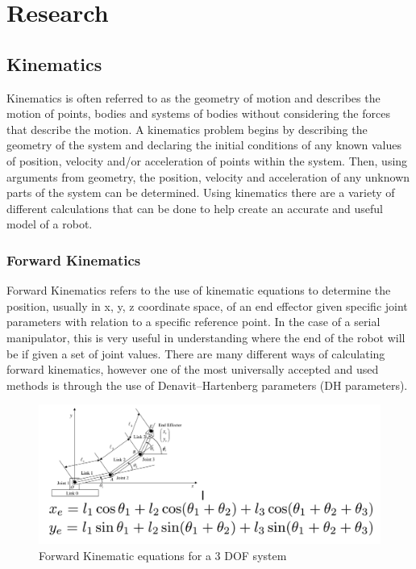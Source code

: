 \graphicspath{ {./figures/} }
\section{Research}
\subsection{Kinematics}
 Kinematics is  often referred to as the geometry of motion and describes the motion of points, bodies and systems of bodies without considering the forces that describe the motion. A kinematics problem begins by describing the geometry of the system and declaring the initial conditions of any known values of position, velocity and/or acceleration of points within the system. Then, using arguments from geometry, the position, velocity and acceleration of any unknown parts of the system can be determined. Using kinematics there are a variety of different calculations that can be done to help create an accurate and useful model of a robot. 
    \subsubsection{Forward Kinematics}
    Forward Kinematics refers to the use of kinematic equations to determine the position, usually in x, y, z coordinate space, of an end effector given specific joint parameters with relation to a specific reference point. In the case of a serial manipulator, this is very useful in understanding where the end of the robot will be if given a set of joint values. There are many different ways of calculating forward kinematics, however one of the most universally accepted and used methods is through the use of Denavit–Hartenberg parameters (DH parameters).
    \begin{figure}[H]
        \centering
        \includegraphics[width=150mm]{3dof.PNG}
        \caption{Forward Kinematic equations for a 3 DOF system}
        \label{fig:my_label}
    \end{figure}
